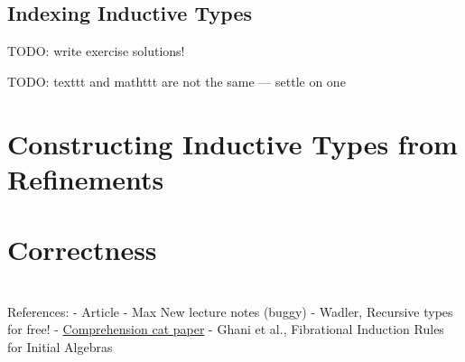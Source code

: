 



\vspace{3cm}

\subsection{Indexing Inductive Types}

TODO: write exercise solutions!

TODO: texttt and mathttt are not the same --- settle on one

\section{Constructing Inductive Types from Refinements}

\section{Correctness}



\section{}

\section{}

References:
- Article
- Max New lecture notes (buggy)
- Wadler, Recursive types for free!
- \href{https://courses.grainger.illinois.edu/cs522/sp2016/ComphrehensionCategoriesAndTheSemanticsOfTypeDependency.pdf}{Comprehension cat paper}
- Ghani et al., Fibrational Induction Rules for Initial Algebras
